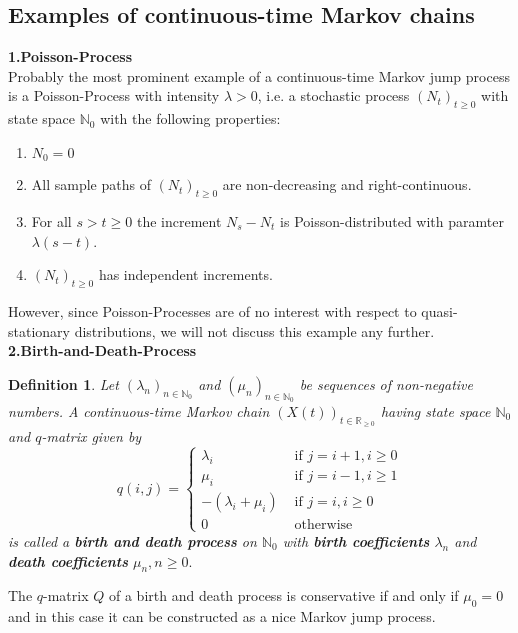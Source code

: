 \documentclass[12pt,a4paper]{scrartcl}
\newtheorem{definition}[theorem]{Definition}
\numberwithin{equation}{section}
\newcommand{\R}{\mathbb{R}} %
\newcommand{\N}{\mathbb{N}} %
\begin{document}
\subsection{Examples of continuous-time Markov chains}

\textbf{1.Poisson-Process}\\
Probably the most prominent example of a continuous-time Markov jump process is a Poisson-Process with intensity $\lambda > 0$, i.e. a stochastic process $\left(N_t\right)_{t \geq 0} $ with state space $\N_0$ with the following properties:
\begin{enumerate}
\item $N_0 = 0$
\item All sample paths of $\left(N_t\right)_{t \geq 0} $ are non-decreasing and right-continuous.
\item For all $s > t \geq 0$ the increment $N_s - N_t $ is Poisson-distributed with paramter $\lambda\left(s-t\right)$.
\item $\left(N_t\right)_{t \geq 0} $ has independent increments.
\end{enumerate}
However, since Poisson-Processes are of no interest with respect to quasi-stationary distributions, we will not discuss this example any further.\\[2ex]

\textbf{2.Birth-and-Death-Process}
\begin{definition}
Let $\left(\lambda_n \right)_{n \in \N_0}$ and $\left(\mu_n \right)_{n \in \N_0}$ be sequences of non-negative numbers. A continuous-time Markov chain $\left(X\left(t\right) \right)_{t \in \R_{\geq 0}}$ having state space $\N_0$ and $q$-matrix given by 
$$ q\left(i,j\right) = \begin{cases} \lambda_i &\mbox{ if } j=i+1, i \geq 0 \\ \mu_i &\mbox{ if } j= i-1, i\geq 1 \\ -\left(\lambda_i + \mu_i \right) &\mbox{ if } j=i, i \geq 0 \\ 0 &\mbox{ otherwise }\end{cases} $$
is called a \textbf{birth and death process} on $\N_0$ with \textbf{birth coefficients} $\lambda_n$ and \textbf{death coefficients} $\mu_n, n \geq 0. $
\end{definition}
 
The $q$-matrix $Q$ of a birth and death process is conservative if and only if $\mu_0 = 0$ and in this case it can be constructed as a nice Markov jump process. \\[2ex]
\end{document}
